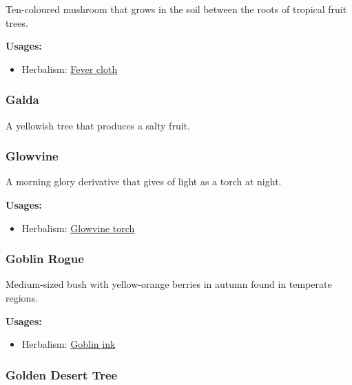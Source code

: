 Ten-coloured mushroom that grows in the soil between the roots of tropical fruit trees.

\vspace{5mm}

\textbf{Usages:}

\begin{itemize}[noitemsep]
\item[] Herbalism: \hyperref[Fever cloth]{Fever cloth}
\end{itemize}

\subsubsection{Galda}
\label{Galda}

A yellowish tree that produces a salty fruit.

\subsubsection{Glowvine}
\label{Glowvine}

A morning glory derivative that gives of light as a torch at night.

\vspace{5mm}

\textbf{Usages:}

\begin{itemize}[noitemsep]
\item[] Herbalism: \hyperref[Glowvine torch]{Glowvine torch}
\end{itemize}

\subsubsection{Goblin Rogue}
\label{Goblin Rogue}

Medium-sized bush with yellow-orange berries in autumn found in temperate regions.

\vspace{5mm}

\textbf{Usages:}

\begin{itemize}[noitemsep]
\item[] Herbalism: \hyperref[Goblin ink]{Goblin ink}
\end{itemize}

\subsubsection{Golden Desert Tree}
\label{Golden Desert Tree}

